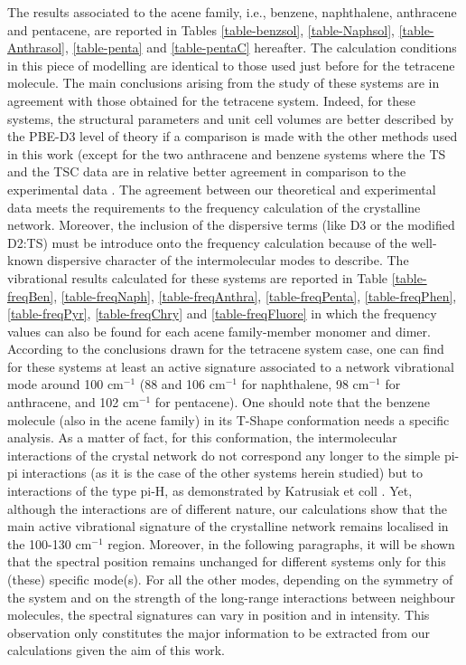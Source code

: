 The results associated to the acene family, i.e., benzene, naphthalene, anthracene and pentacene, are reported in Tables \ref{table-benzsol}, \ref{table-Naphsol}, \ref{table-Anthrasol}, \ref{table-penta} and \ref{table-pentaC} hereafter. The calculation conditions in this piece of modelling are identical to those used just before for the tetracene molecule. The main conclusions arising from the study of these systems are in agreement with those obtained for the tetracene system. Indeed, for these systems, the structural parameters and unit cell volumes are better described by the PBE-D3 level of theory if a comparison is made with the other methods used in this work (except for the two anthracene and benzene systems where the TS and the TSC data are in relative better agreement in comparison to the experimental data \cite{buvcko2013tkatchenko}. The agreement between our theoretical and experimental data meets the requirements to the frequency calculation of the crystalline network. Moreover, the inclusion of the dispersive terms (like D3 or the modified D2:TS) must be introduce onto the frequency calculation because of the well-known dispersive character of the intermolecular modes to describe. The vibrational results calculated for these systems are reported in Table \ref{table-freqBen}, \ref{table-freqNaph}, \ref{table-freqAnthra}, \ref{table-freqPenta}, \ref{table-freqPhen}, \ref{table-freqPyr}, \ref{table-freqChry} and \ref{table-freqFluore} in which the frequency values can also be found for each acene family-member monomer and dimer. According to the conclusions drawn for the tetracene system case, one can find for these systems at least an active signature associated to a network vibrational mode around 100 cm$^{-1}$ (88 and 106 cm$^{-1}$ for naphthalene, 98 cm$^{-1}$ for anthracene, and 102 cm$^{-1}$ for pentacene). One should note that the benzene molecule (also in the acene family) in its T-Shape conformation needs a specific analysis. As a matter of fact, for this conformation, the intermolecular interactions of the crystal network do not correspond any longer to the simple pi-pi interactions (as it is the case of the other systems herein studied) but to interactions of the type pi-H, as demonstrated by Katrusiak et coll \cite{katrusiak2010association}. Yet, although the interactions are of different nature, our calculations show that the main active vibrational signature of the crystalline network remains localised in the 100-130 cm$^{-1}$ region. Moreover, in the following paragraphs, it will be shown that the spectral position remains unchanged for different systems only for this (these) specific mode(s). For all the other modes, depending on the symmetry of the system and on the strength of the long-range interactions between neighbour molecules, the spectral signatures can vary in position and in intensity. This observation only constitutes the major information to be extracted from our calculations given the aim of this work.	
 	
